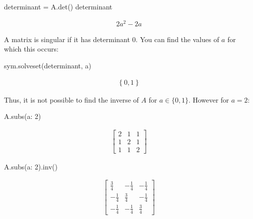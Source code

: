 \begin{pyin}
determinant = A.det()
determinant
\end{pyin}




\begin{equation*}
\begin{split}\displaystyle 2 a^{2} - 2 a\end{split}
\end{equation*}




A matrix is singular if it has determinant 0. You can find the values of \(a\) for
which this occurs:




\begin{pyin}
sym.solveset(determinant, a)
\end{pyin}




\begin{equation*}
\begin{split}\displaystyle \left\{0, 1\right\}\end{split}
\end{equation*}

Thus, it is not possible to find the inverse of \(A\) for \(a\in\{0, 1\}\).
However for \(a = 2\):




\begin{pyin}
A.subs({a: 2})
\end{pyin}




\begin{equation*}
\begin{split}\displaystyle \left[\begin{matrix}2 & 1 & 1\\1 & 2 & 1\\1 & 1 & 2\end{matrix}\right]\end{split}
\end{equation*}






\begin{pyin}
A.subs({a: 2}).inv()
\end{pyin}




\begin{equation*}
\begin{split}\displaystyle \left[\begin{matrix}\frac{3}{4} & - \frac{1}{4} & - \frac{1}{4}\\- \frac{1}{4} & \frac{3}{4} & - \frac{1}{4}\\- \frac{1}{4} & - \frac{1}{4} & \frac{3}{4}\end{matrix}\right]\end{split}
\end{equation*}




